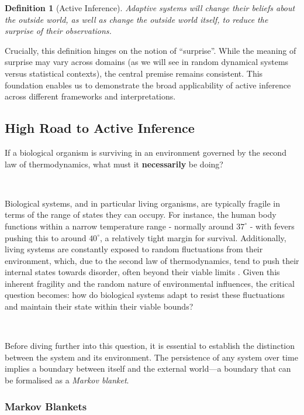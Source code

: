\documentclass{article}
\newtheorem{definition}{Definition}
\begin{document}
\begin{definition}[Active Inference]

Adaptive systems will change their beliefs about the outside world, as well as change the outside world itself, to reduce the surprise of their observations.

\end{definition}

Crucially, this definition hinges on the notion of ``surprise''. While the meaning of surprise may vary across domains (as we will see in random dynamical systems versus statistical contexts), the central premise remains consistent. This foundation enables us to demonstrate the broad applicability of active inference across different frameworks and interpretations.


\subsection{High Road to Active Inference}

If a biological organism is surviving in an environment governed by the second law of thermodynamics, what must it \textbf{necessarily} be doing?

\

Biological systems, and in particular living organisms, are typically fragile in terms of the range of states they can occupy. For instance, the human body functions within a narrow temperature range - normally around $37^\circ$ - with fevers pushing this to around $40^\circ$, a relatively tight margin for survival. Additionally, living systems are constantly exposed to random fluctuations from their environment, which, due to the second law of thermodynamics, tend to push their internal states towards disorder, often beyond their viable limits \citep{friston2012free}. Given this inherent fragility and the random nature of environmental influences, the critical question becomes: how do biological systems adapt to resist these fluctuations and maintain their state within their viable bounds?

\

Before diving further into this question, it is essential to establish the distinction between the system and its environment. The persistence of any system over time implies a boundary between itself and the external world—a boundary that can be formalised as a \textit{Markov blanket}.

\subsubsection{Markov Blankets}
\end{document}
